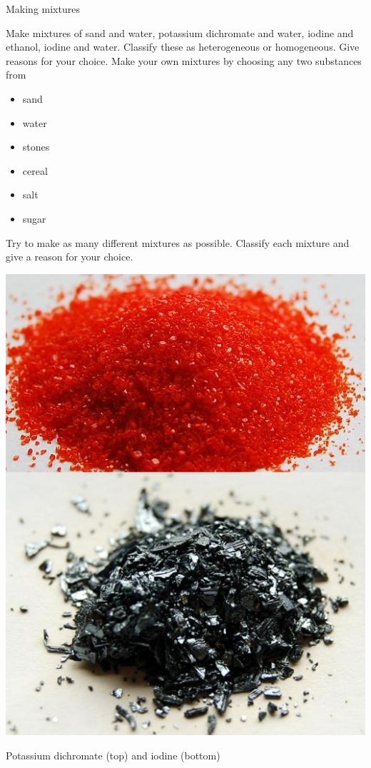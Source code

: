 \begin{activity}{Making mixtures}
{
\begin{minipage}{0.6\textwidth}
Make mixtures of sand and water, potassium dichromate and water, iodine and ethanol, iodine and water. Classify these as heterogeneous or homogeneous. Give reasons for your choice. Make your own mixtures by choosing any two substances from 
\begin{itemize}[noitemsep] 
\item sand 
\item water 
\item stones 
\item cereal 
\item salt 
\item sugar 
\end{itemize} 
Try to make as many different mixtures as possible. Classify each mixture and give a reason for your choice.
                                                                                                                                                                                                                                                                                                                                                                                                                      
\end{minipage}
\begin{minipage}{.4\textwidth}
{
\begin{center}
 \includegraphics[width=.7\textwidth]{photos/iodine-KCr2O7-wikipedia.jpg}\par
\begin{caption}Potassium dichromate (top) and iodine (bottom)\end{caption}
\end{center}
}

\end{minipage}
}
\end{activity}
